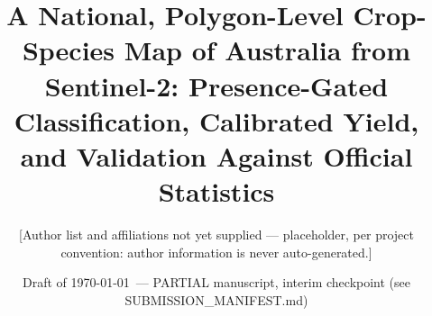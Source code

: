 
\title{A National, Polygon-Level Crop-Species Map of Australia from Sentinel-2: Presence-Gated Classification, Calibrated Yield, and Validation Against Official Statistics}

\author{[Author list and affiliations not yet supplied --- placeholder, per project convention: author information is never auto-generated.]}

\date{Draft of \today\ --- PARTIAL manuscript, interim checkpoint (see SUBMISSION\_MANIFEST.md)}

\newcommand{\keywordlist}{crop-type mapping; Sentinel-2; Segment Anything Model; presence detection; accuracy assessment; gradient boosting; Australia}
